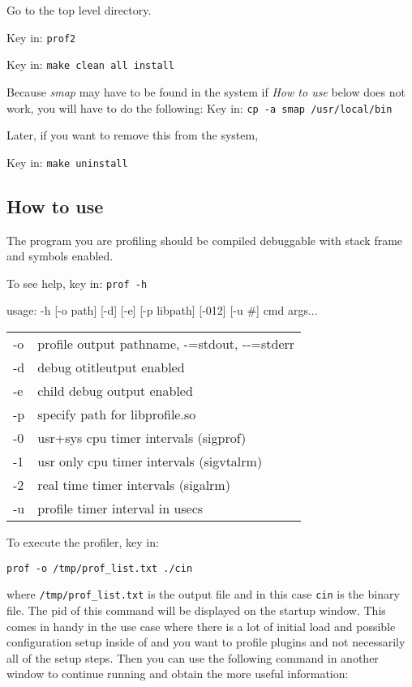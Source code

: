 Go to the top level \CGG{} directory.

Key in: \qquad \texttt{prof2}

Key in: \qquad \texttt{make clean all install}

Because \textit{smap} may have to be found in the system if \textit{How to use} below does not work, you will have to do the following:
\newline
\newline
Key in: \qquad \texttt{cp -a smap /usr/local/bin}


Later, if you want to remove this from the system,

Key in: \qquad \texttt{make uninstall}

\subsection{How to use}
\label{sub:how_to_use}

The program you are profiling should be compiled debuggable with stack frame and symbols enabled.

To see help, key in: \qquad \texttt{prof -h}

usage: -h [-o path] [-d] [-e] [-p libpath] [-012] [-u \#] cmd args...

\hspace{2em}
\begin{tabular}{@{}ll}
	-o & profile output pathname, -=stdout, -{}-=stderr\\
	-d & debug otitleutput enabled\\
	-e & child debug output enabled\\
	-p & specify path for libprofile.so\\
	-0 & usr+sys cpu timer intervals (sigprof)\\
	-1 & usr only cpu timer intervals (sigvtalrm)\\
	-2 & real time timer intervals (sigalrm)\\
	-u & profile timer interval in usecs\\
\end{tabular}

To execute the profiler, key in:

\hspace{2em}\texttt{prof -o /tmp/prof\_list.txt ./cin}

where \texttt{/tmp/prof\_list.txt} is the output file and in this case \texttt{cin} is the \CGG{} binary file. The pid of this command will be displayed on the startup window. This comes in handy in the use case where there is a lot of initial load and possible configuration setup inside of \CGG{} and you want to profile plugins and not necessarily all of the setup steps. Then you can use the following command in another window to continue running \CGG{} and obtain the more useful information:

